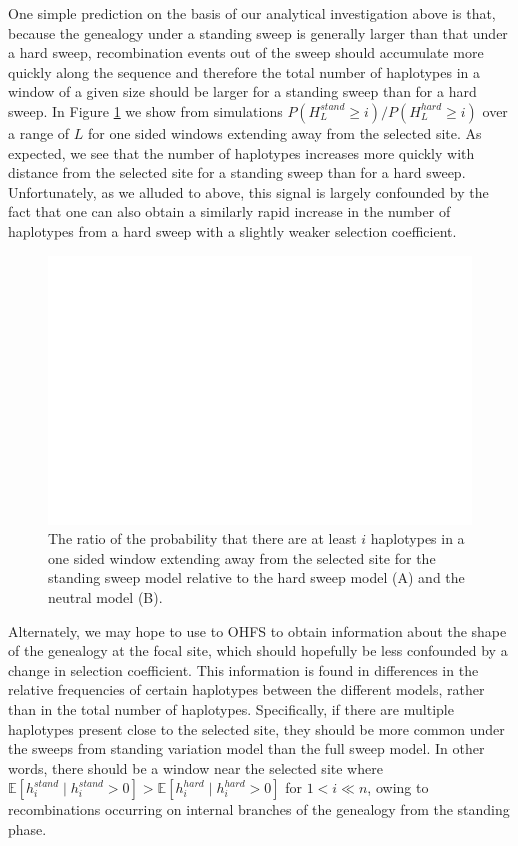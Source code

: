 \documentclass[a4paper,10pt]{article}
\begin{document}
One simple prediction on the basis of our analytical investigation above is that, because the genealogy under a standing sweep is generally larger than that under a hard sweep, recombination events out of the sweep should accumulate more quickly along the sequence and therefore the total number of haplotypes in a window of a given size should be larger for a standing sweep than for a hard sweep. In Figure \ref{hap-exist-probs} we show from simulations $P\left(H_L^{stand} \geq i \right)/P\left(H_L^{hard} \geq i \right)$ over a range of $L$ for one sided windows extending away from the selected site. As expected, we see that the number of haplotypes increases more quickly with distance from the selected site for a standing sweep than for a hard sweep. Unfortunately, as we alluded to above, this signal is largely confounded by the fact that one can also obtain a similarly rapid increase in the number of haplotypes from a hard sweep with a slightly weaker selection coefficient.

\begin{figure}
		\includegraphics[width = \textwidth]{../Paper_Figures/HapFreqsExistProb.pdf}
	\caption{The ratio of the probability that there are at least $i$ haplotypes in a one sided window extending away from the selected site for the standing sweep model relative to the hard sweep model (A) and the neutral model (B).} \label{hap-exist-probs}
\end{figure}

Alternately, we may hope to use to OHFS to obtain information about the shape of the genealogy at the focal site, which should hopefully be less confounded by a change in selection coefficient. This information is found in differences in the relative frequencies of certain haplotypes between the different models, rather than in the total number of haplotypes. Specifically, if there are multiple haplotypes present close to the selected site,  they should be more common under the sweeps from standing variation model than the full sweep model. In other words, there should be a window near the selected site where $\mathbb{E}[h_i^{stand} \mid h_i^{stand} > 0] > \mathbb{E}[h_i^{hard} \mid h_i^{hard} > 0]$ for $1 < i \ll n$, owing to recombinations occurring on internal branches of the genealogy from the standing phase. 
\end{document}
